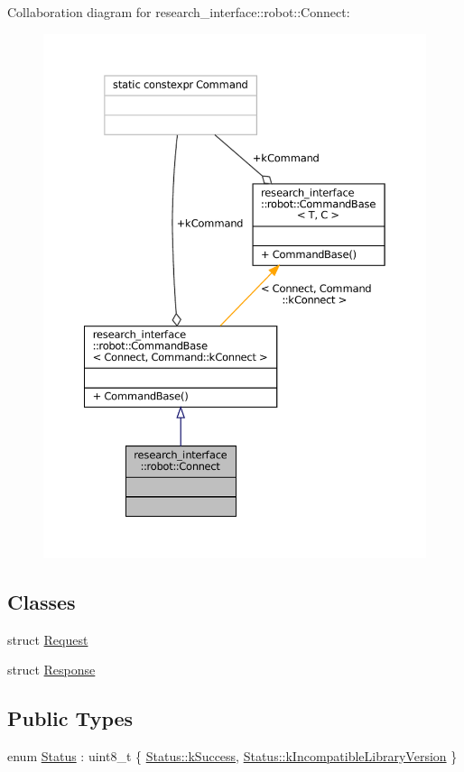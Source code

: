 Collaboration diagram for research\+\_\+interface\+:\+:robot\+:\+:Connect\+:
\nopagebreak
\begin{figure}[H]
\begin{center}
\leavevmode
\includegraphics[width=350pt]{structresearch__interface_1_1robot_1_1Connect__coll__graph}
\end{center}
\end{figure}
\subsection*{Classes}
\begin{DoxyCompactItemize}
\item 
struct \hyperlink{structresearch__interface_1_1robot_1_1Connect_1_1Request}{Request}
\item 
struct \hyperlink{structresearch__interface_1_1robot_1_1Connect_1_1Response}{Response}
\end{DoxyCompactItemize}
\subsection*{Public Types}
\begin{DoxyCompactItemize}
\item 
enum \hyperlink{structresearch__interface_1_1robot_1_1Connect_acd25a9893ac3b26eeb1eb776173c7e69}{Status} \+: uint8\+\_\+t \{ \hyperlink{structresearch__interface_1_1robot_1_1Connect_acd25a9893ac3b26eeb1eb776173c7e69a8c632159fa131f09d04f94e3cbcd8782}{Status\+::k\+Success}, 
\hyperlink{structresearch__interface_1_1robot_1_1Connect_acd25a9893ac3b26eeb1eb776173c7e69a76c46964a75e7749a84b1275e5a0d6a2}{Status\+::k\+Incompatible\+Library\+Version}
 \}
\end{DoxyCompactItemize}
